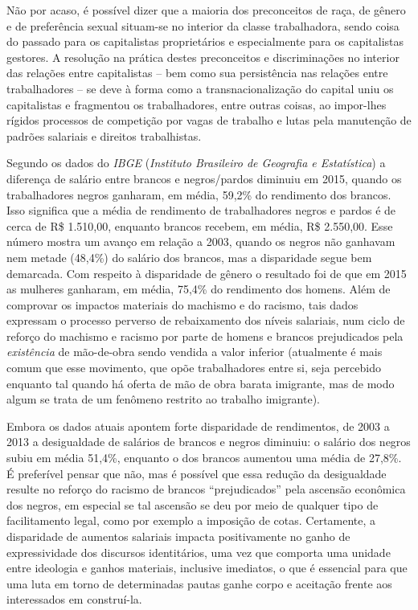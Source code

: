 Não por acaso, é possível dizer que a maioria dos preconceitos de raça,
de gênero e de preferência sexual situam-se no interior da classe
trabalhadora, sendo coisa do passado para os capitalistas proprietários
e especialmente para os capitalistas gestores. A resolução na prática
destes preconceitos e discriminações no interior das relações entre
capitalistas -- bem como sua persistência nas relações entre
trabalhadores -- se deve à forma como a transnacionalização do capital
uniu os capitalistas e fragmentou os trabalhadores, entre outras coisas,
ao impor-lhes rígidos processos de competição por vagas de trabalho e
lutas pela manutenção de padrões salariais e direitos trabalhistas.

Segundo os dados do \emph{IBGE} (\emph{Instituto Brasileiro de Geografia
e Estatística}) a diferença de salário entre brancos e negros/pardos
diminuiu em 2015, quando os trabalhadores negros ganharam, em média,
59,2\% do rendimento dos brancos. Isso significa que a média de
rendimento de trabalhadores negros e pardos é de cerca de R\$ 1.510,00,
enquanto brancos recebem, em média, R\$ 2.550,00. Esse número mostra um
avanço em relação a 2003, quando os negros não ganhavam nem metade
(48,4\%) do salário dos brancos, mas a disparidade segue bem demarcada.
Com respeito à disparidade de gênero o resultado foi de que em 2015 as
mulheres ganharam, em média, 75,4\% do rendimento dos homens. Além de
comprovar os impactos materiais do machismo e do racismo, tais dados
expressam o processo perverso de rebaixamento dos níveis salariais, num
ciclo de reforço do machismo e racismo por parte de homens e brancos
prejudicados pela \emph{existência} de mão-de-obra sendo vendida a valor
inferior (atualmente é mais comum que esse movimento, que opõe
trabalhadores entre si, seja percebido enquanto tal quando há oferta de
mão de obra barata imigrante, mas de modo algum se trata de um fenômeno
restrito ao trabalho imigrante).

Embora os dados atuais apontem forte disparidade de rendimentos, de 2003
a 2013 a desigualdade de salários de brancos e negros diminuiu: o
salário dos negros subiu em média 51,4\%, enquanto o dos brancos
aumentou uma média de 27,8\%. É preferível pensar que não, mas é
possível que essa redução da desigualdade resulte no reforço do racismo
de brancos ``prejudicados'' pela ascensão econômica dos negros, em
especial se tal ascensão se deu por meio de qualquer tipo de
facilitamento legal, como por exemplo a imposição de cotas. Certamente,
a disparidade de aumentos salariais impacta positivamente no ganho de
expressividade dos discursos identitários, uma vez que comporta uma
unidade entre ideologia e ganhos materiais, inclusive imediatos, o que é
essencial para que uma luta em torno de determinadas pautas ganhe corpo
e aceitação frente aos interessados em construí-la.

